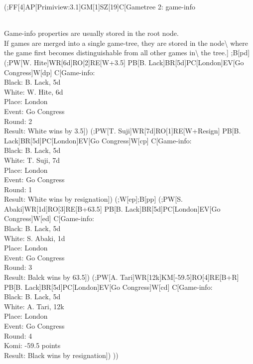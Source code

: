 (;FF{[}4{]}AP{[}Primiview:3.1{]}GM{[}1{]}SZ{[}19{]}C{[}Gametree 2:
game-info\\
\strut \\
Game-info properties are usually stored in the root node.\\
If games are merged into a single game-tree, they are stored in the
node\textbackslash{} where the game first becomes distinguishable from
all other games in\textbackslash{} the tree.{]} ;B{[}pd{]} (;PW{[}W.
Hite{]}WR{[}6d{]}RO{[}2{]}RE{[}W+3.5{]} PB{[}B.
Lack{]}BR{[}5d{]}PC{[}London{]}EV{[}Go Congress{]}W{[}dp{]}
C{[}Game-info:\\
Black: B. Lack, 5d\\
White: W. Hite, 6d\\
Place: London\\
Event: Go Congress\\
Round: 2\\
Result: White wins by 3.5{]}) (;PW{[}T.
Suji{]}WR{[}7d{]}RO{[}1{]}RE{[}W+Resign{]} PB{[}B.
Lack{]}BR{[}5d{]}PC{[}London{]}EV{[}Go Congress{]}W{[}cp{]}
C{[}Game-info:\\
Black: B. Lack, 5d\\
White: T. Suji, 7d\\
Place: London\\
Event: Go Congress\\
Round: 1\\
Result: White wins by resignation{]}) (;W{[}ep{]};B{[}pp{]} (;PW{[}S.
Abaki{]}WR{[}1d{]}RO{[}3{]}RE{[}B+63.5{]} PB{[}B.
Lack{]}BR{[}5d{]}PC{[}London{]}EV{[}Go Congress{]}W{[}ed{]}
C{[}Game-info:\\
Black: B. Lack, 5d\\
White: S. Abaki, 1d\\
Place: London\\
Event: Go Congress\\
Round: 3\\
Result: Balck wins by 63.5{]}) (;PW{[}A.
Tari{]}WR{[}12k{]}KM{[}-59.5{]}RO{[}4{]}RE{[}B+R{]} PB{[}B.
Lack{]}BR{[}5d{]}PC{[}London{]}EV{[}Go Congress{]}W{[}cd{]}
C{[}Game-info:\\
Black: B. Lack, 5d\\
White: A. Tari, 12k\\
Place: London\\
Event: Go Congress\\
Round: 4\\
Komi: -59.5 points\\
Result: Black wins by resignation{]}) ))

